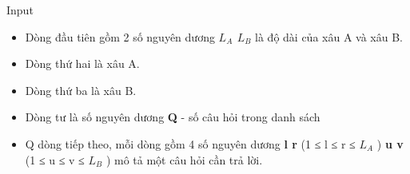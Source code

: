 Input  
\begin{itemize}
	\item     Dòng đầu tiên gồm 2 số nguyên dương    \textbf{     $L_{A}$     $L_{B}$}    là độ dài của xâu A và xâu B.   
	\item     Dòng thứ hai là xâu A.   
	\item     Dòng thứ ba là xâu B.   
	\item     Dòng tư là số nguyên dương    \textbf{     Q    }    - số câu hỏi trong danh sách   
	\item     Q dòng tiếp theo, mỗi dòng gồm 4 số nguyên dương    \textbf{     l r    }    (1 ≤ l ≤ r ≤ $L_{A}$    )    \textbf{     u v    }    (1 ≤ u ≤ v ≤ $L_{B}$    ) mô tả một câu hỏi cần trả lời.   
\end{itemize}